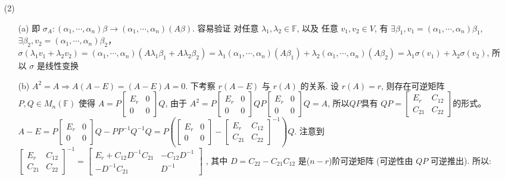 \documentclass{article}
\begin{document}
\begin{spacing}{1.5}
\begin{itemize}
\begin{itemize}
        \item [(2)] 
        \begin{itemize}
            \item [(a)] 即 $\sigma_A: (\alpha_1, \cdots, \alpha_n) \beta \to (\alpha_1,\cdots,\alpha_n) (A\beta)$. 容易验证 对任意 $\lambda_1, \lambda_2 \in \mathbb{F}$, 以及 任意 $v_1, v_2\in V$, 有 $\exists \beta_1, v_1 = (\alpha_1, \cdots, \alpha_n) \beta_1$, $\exists \beta_2, v_2 = (\alpha_1, \cdots, \alpha_n) \beta_2$， $\sigma(\lambda_1 v_1+ \lambda_2 v_2) = (\alpha_1, \cdots, \alpha_n) (A\lambda_1\beta_1 + A\lambda_2\beta_2) = \lambda_1(\alpha_1, \cdots, \alpha_n)(A\beta_1) + \lambda_2(\alpha_1, \cdots, \alpha_n)(A\beta_2) = \lambda_1 \sigma(v_1) + \lambda_2 \sigma(v_2)$, 所以 $\sigma$ 是线性变换
            \item [(b)] $A^2 = A \Rightarrow A(A-E) = (A-E)A = 0$. 下考察 $r(A-E)$ 与 $r(A)$ 的关系. 设 $r(A) = r$, 则存在可逆矩阵 $P, Q\in M_n(\mathbb{F})$ 使得 $A = P\left[\begin{array}{cc}E_r&0\\0&0\end{array}\right]Q$, 由于 $A^2 = P\left[\begin{array}{cc}E_r&0\\0&0\end{array}\right]QP\left[\begin{array}{cc}E_r&0\\0&0\end{array}\right]Q=A$, 所以$QP$具有 $QP=\left[\begin{array}{cc}E_r&C_{12}\\C_{21}&C_{22}\end{array}\right]$的形式。$A - E = P\left[\begin{array}{cc}E_r&0\\0&0\end{array}\right]Q - PP^{-1}Q^{-1}Q = P\left(\left[\begin{array}{cc}E_r&0\\0&0\end{array}\right] - \left[\begin{array}{cc}E_{r}&C_{12}\\C_{21}&C_{22}\end{array}\right]^{-1}\right)Q$. 注意到 $\left[\begin{array}{cc}E_r&C_{12}\\C_{21}&C_{22}\end{array}\right]^{-1} = \left[\begin{array}{cc}E_r + C_{12}D^{-1}C_{21}&-C_{12}D^{-1}\\-D^{-1}C_{21}&D^{-1}\end{array}\right]$ , 其中 $D = C_{22} - C_{21}C_{12}$ 是($n-r$)阶可逆矩阵 (可逆性由 $QP$ 可逆推出). 所以: 

\end{itemize}
\end{itemize}
\end{itemize}
\end{spacing}
\end{document}
